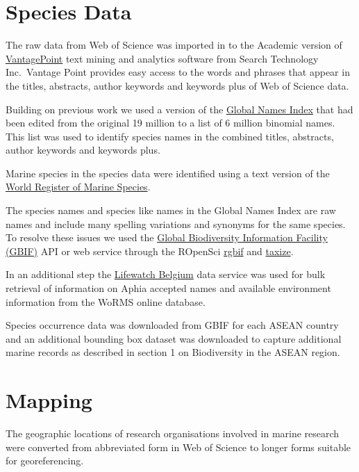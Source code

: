 \documentclass[]{book}
\theoremstyle{definition}
\theoremstyle{definition}
\theoremstyle{definition}
\theoremstyle{remark}
\begin{document}
\hypertarget{species-data}{%
\section{Species Data}\label{species-data}}

The raw data from Web of Science was imported in to the Academic version
of \href{https://thevantagepoint.com/}{VantagePoint} text mining and
analytics software from Search Technology Inc.~Vantage Point provides
easy access to the words and phrases that appear in the titles,
abstracts, author keywords and keywords plus of Web of Science data.

Building on previous work we used a version of the
\href{http://gni.globalnames.org/}{Global Names Index} that had been
edited from the original 19 million to a list of 6 million binomial
names. This list was used to identify species names in the combined
titles, abstracts, author keywords and keywords plus.

Marine species in the species data were identified using a text version
of the \href{http://www.marinespecies.org/}{World Register of Marine
Species}.

The species names and species like names in the Global Names Index are
raw names and include many spelling variations and synonyms for the same
species. To resolve these issues we used the
\href{https://www.gbif.org/}{Global Biodiversity Information Facility
(GBIF)} API or web service through the ROpenSci \href{}{rgbif} and
\href{}{taxize}.

In an additional step the
\href{http://www.lifewatch.be/data-services/?cache=1521050271}{Lifewatch
Belgium} data service was used for bulk retrieval of information on
Aphia accepted names and available environment information from the
WoRMS online database.

Species occurrence data was downloaded from GBIF for each ASEAN country
and an additional bounding box dataset was downloaded to capture
additional marine records as described in section 1 on Biodiversity in
the ASEAN region.

\hypertarget{mapping}{%
\section{Mapping}\label{mapping}}

The geographic locations of research organisations involved in marine
research were converted from abbreviated form in Web of Science to
longer forms suitable for georeferencing.
\end{document}
